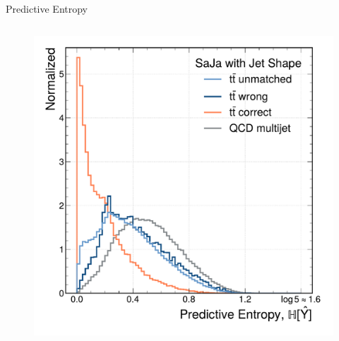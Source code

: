 \begin{frame}[fragile]{Predictive Entropy}
\begin{columns}[T,onlytextwidth]
\begin{figure}
      \includegraphics[width=\textwidth]{fig/entropy/entropy-with-jet-shape.pdf}
    \end{figure}
  \end{columns}
  
\end{frame}

